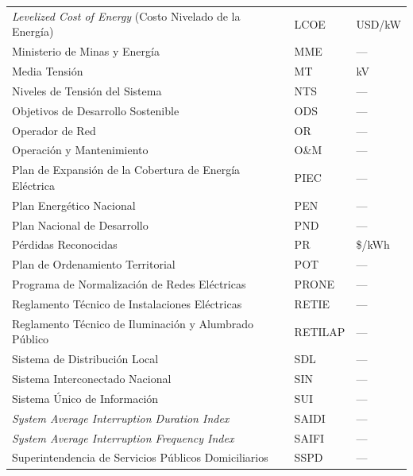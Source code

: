 \begin{longtable}{p{8.5cm} p{3cm} p{2cm}}
\textit{Levelized Cost of Energy} (Costo Nivelado de la Energía) & LCOE & USD/kW \\
Ministerio de Minas y Energía                             & MME      & ---       \\
Media Tensión                                             & MT       & kV        \\
Niveles de Tensión del Sistema                            & NTS      & ---       \\
Objetivos de Desarrollo Sostenible                        & ODS      & ---       \\
Operador de Red                                           & OR       & ---       \\
Operación y Mantenimiento                                 & O\&M     & ---       \\
Plan de Expansión de la Cobertura de Energía Eléctrica    & PIEC     & ---       \\
Plan Energético Nacional                                  & PEN      & ---       \\
Plan Nacional de Desarrollo                               & PND      & ---       \\
Pérdidas Reconocidas                                      & PR       & \$/kWh    \\
Plan de Ordenamiento Territorial                          & POT      & ---       \\
Programa de Normalización de Redes Eléctricas             & PRONE    & ---       \\
Reglamento Técnico de Instalaciones Eléctricas            & RETIE    & ---       \\
Reglamento Técnico de Iluminación y Alumbrado Público     & RETILAP  & ---       \\
Sistema de Distribución Local                             & SDL      & ---       \\
Sistema Interconectado Nacional                           & SIN      & ---       \\
Sistema Único de Información                              & SUI      & ---       \\
\textit{System Average Interruption Duration Index}       & SAIDI    & ---       \\
\textit{System Average Interruption Frequency Index}      & SAIFI    & ---       \\
Superintendencia de Servicios Públicos Domiciliarios      & SSPD     & ---       \\

\end{longtable}
